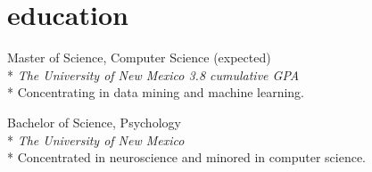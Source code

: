 \documentclass[print]{friggeri-cv} %
\begin{document}
  \iftoggle{cv}{
\begin{description}
  \item  {\largeheaderfont Student Volunteer } {\smallheaderfont \hfill 2008\textemdash 2010} \\*
    {\footnotesize \emph{The Mind Research Network, Albuquerque, NM}} \hfill \\*
    Assisted with a study ran by Pilar Sanjuan, PhD investigating substance use
    and post-traumatic stress disorder (PTSD) in recently returned combat
    veterans. \\*
\end{description}


\begin{description}
  \item  {\largeheaderfont Student Volunteer}  \hfill {\smallheaderfont 2008 } \\*
    {\footnotesize \emph{The University of New Mexico, Albuquerque, NM}\textemdash } \\*
    Assisted Akaysha Tang, PhD, with a study investigating stress regulation in
    rats and assisted an expert in troubleshooting and repairing an EEG system
    for a study investigating stress in humans.\\*
\end{description}
}{
}

\section{education}
\begin{description}
  \item {\largeheaderfont Master of Science, Computer Science}  \hfill 
    { (expected)} \\*
    {\footnotesize \emph{The University of New Mexico  \hfill 3.8 cumulative GPA}} \\*
    Concentrating in data mining and machine learning.
\end{description}
\begin{description}
  \item  {\largeheaderfont Bachelor of Science, Psychology } \hfill
    { }\\*
    {\footnotesize \emph{The University of New Mexico  }} \\*
    Concentrated in neuroscience and minored in computer science.
\end{description}
\end{document}
